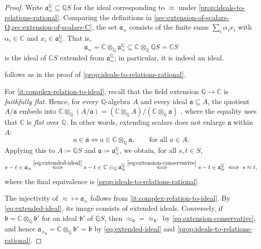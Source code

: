 \documentclass[11pt]{scrartcl}
\theoremstyle{definition}
\theoremstyle{plain}
\theoremstyle{remark}
\begin{document}
	\begin{proof}
		Write $\mathfrak{a}^{\mathbb{Q}}_{\approx} \subseteq \mathbb{Q}S$
		for the ideal corresponding to $\approx$ under \cref{prop:ideals-to-relations-rational}.
		Comparing the definitions in \cref{sec:extension-of-scalars-Q,sec:extension-of-scalars-C},
		the set $\mathfrak{a}_{\approx}$ consists of the finite sums $\sum_i \alpha_i x_i$
		with $\alpha_i \in \mathbb{C}$ and $x_i \in \mathfrak{a}^{\mathbb{Q}}_{\approx}$.
		That is,
		\begin{equation}\label{eq:extended-ideal}
			\mathfrak{a}_{\approx}
			= \mathbb{C} \otimes_{\mathbb{Q}} \mathfrak{a}^{\mathbb{Q}}_{\approx}
			\subseteq \mathbb{C} \otimes_{\mathbb{Q}} \mathbb{Q}S = \mathbb{C}S
		\end{equation}
		is the ideal of $\mathbb{C}S$ extended from $\mathfrak{a}^{\mathbb{Q}}_{\approx}$;
		in particular, it is indeed an ideal.

		 follows as in the proof of \cref{prop:ideals-to-relations-rational}.

		For \cref{it:complex-relation-to-ideal},
		recall that the field extension $\mathbb{Q} \to \mathbb{C}$ is \emph{faithfully flat}.
		Hence, for every $\mathbb{Q}$-algebra $A$ and every ideal $\mathfrak{a} \subseteq A$,
		the quotient $A / \mathfrak{a}$ embeds into
		$\mathbb{C} \otimes_{\mathbb{Q}} (A/\mathfrak{a}) = (\mathbb{C} \otimes_{\mathbb{Q}} A)/(\mathbb{C} \otimes_{\mathbb{Q}} \mathfrak{a})$
		\cite[\href{https://stacks.math.columbia.edu/tag/05CK}{Tag 05CK}]{STACKS},
		where the equality uses that $\mathbb{C}$ is
		\emph{flat} \cite[\href{https://stacks.math.columbia.edu/tag/00HB}{Tag 00HB}]{STACKS} over $\mathbb{Q}$.
		In other words, extending scalars does not enlarge $\mathfrak{a}$ within $A$:
		\begin{equation}\label{eq:extension-conservative}
			a \in \mathfrak{a} \iff a \in \mathbb{C} \otimes_{\mathbb{Q}} \mathfrak{a},
			\qquad \text{for all } a \in A.
		\end{equation}
		Applying this to $A \coloneqq \mathbb{Q}S$ and $\mathfrak{a} \coloneqq \mathfrak{a}^{\mathbb{Q}}_{\approx}$,
		we obtain, for all $s,t\in S$,
		\[
			s - t \in \mathfrak{a}_{\approx}
			\overset{\eqref{eq:extended-ideal}}{\iff} s - t \in \mathbb{C} \otimes_{\mathbb{Q}} \mathfrak{a}^{\mathbb{Q}}_{\approx}
			\overset{\eqref{eq:extension-conservative}}{\iff} s - t \in \mathfrak{a}^{\mathbb{Q}}_{\approx}
			\iff s \approx t,
		\]
		where the final equivalence is \cref{prop:ideals-to-relations-rational}.

		The injectivity of ${\approx} \mapsto \mathfrak{a}_{\approx}$ follows from
		\cref{it:complex-relation-to-ideal}.
		By \eqref{eq:extended-ideal}, its image consists of extended ideals.
		Conversely, if $\mathfrak{b} = \mathbb{C} \otimes_{\mathbb{Q}} \mathfrak{b}'$
		for an ideal $\mathfrak{b}'$ of $\mathbb{Q}S$,
		then ${\approx_{\mathfrak{b}}} = {\approx_{\mathfrak{b}'}}$ by \eqref{eq:extension-conservative},
		and hence $\mathfrak{a}_{\approx_{\mathfrak{b}}} = \mathbb{C} \otimes_{\mathbb{Q}} \mathfrak{b}' = \mathfrak{b}$
		by \eqref{eq:extended-ideal} and \cref{prop:ideals-to-relations-rational}.
	\end{proof}
\end{document}
